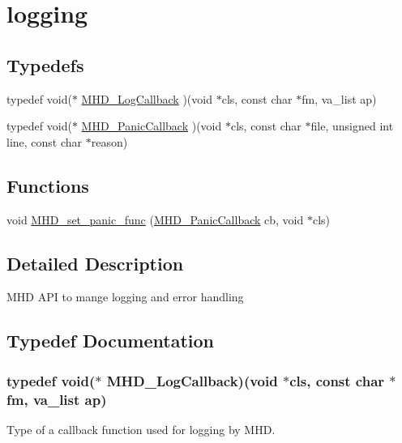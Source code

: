 \hypertarget{group__logging}{\section{logging}
\label{group__logging}
}
\subsection*{\-Typedefs}
\begin{DoxyCompactItemize}
\item 
typedef void($\ast$ \hyperlink{group__logging_gaff0dcaf7b7ec48a5889ca30654f900dd}{\-M\-H\-D\-\_\-\-Log\-Callback} )(void $\ast$cls, const char $\ast$fm, va\-\_\-list ap)
\item 
typedef void($\ast$ \hyperlink{group__logging_gaf4ede9ce6b9eba25cb76ae1375cdd6ff}{\-M\-H\-D\-\_\-\-Panic\-Callback} )(void $\ast$cls, const char $\ast$file, unsigned int line, const char $\ast$reason)
\end{DoxyCompactItemize}
\subsection*{\-Functions}
\begin{DoxyCompactItemize}
\item 
void \hyperlink{group__logging_gaeaf2bb82c7b18758b7b912048ea34f23}{\-M\-H\-D\-\_\-set\-\_\-panic\-\_\-func} (\hyperlink{group__logging_gaf4ede9ce6b9eba25cb76ae1375cdd6ff}{\-M\-H\-D\-\_\-\-Panic\-Callback} cb, void $\ast$cls)
\end{DoxyCompactItemize}


\subsection{\-Detailed \-Description}
\-M\-H\-D \-A\-P\-I to mange logging and error handling 

\subsection{\-Typedef \-Documentation}
\hypertarget{group__logging_gaff0dcaf7b7ec48a5889ca30654f900dd}{
\subsubsection[{\-M\-H\-D\-\_\-\-Log\-Callback}]{\setlength{\rightskip}{0pt plus 5cm}typedef void($\ast$ {\bf \-M\-H\-D\-\_\-\-Log\-Callback})(void $\ast$cls, const char $\ast$fm, va\-\_\-list ap)}}\label{group__logging_gaff0dcaf7b7ec48a5889ca30654f900dd}
\-Type of a callback function used for logging by \-M\-H\-D.


